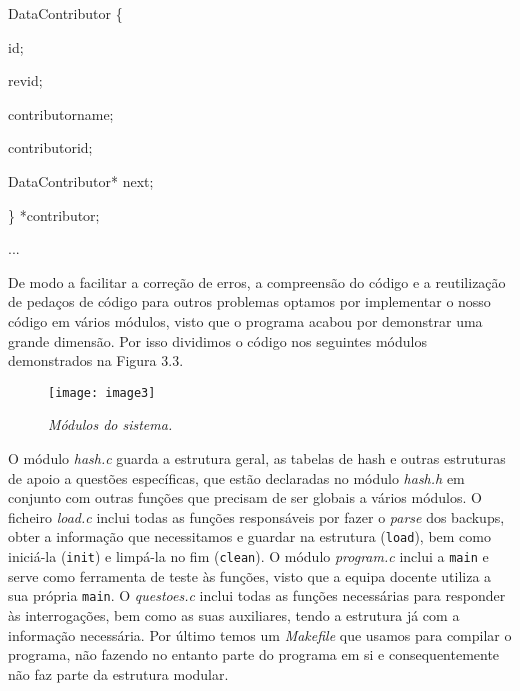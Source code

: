 \documentclass[a4paper,12pt]{report}
\newcommand\tab[1][1cm]{\hspace*{#1}}
\begin{document}
\begin{tcolorbox}[width=\textwidth,colback={darkgray},title={\sf Excerto 3.7: hash.c},outer arc=2mm,colupper=white]    
	{\footnotesize{} DataContributor \{
		
		\tab {\color{newpink}long} id;
		
		\tab {\color{newpink}int} revid;
		
		\tab {\color{newpink}char *} contributorname;
		
		\tab {\color{newpink}int} contributorid;
		
		\tab {\color{newpink}struct} DataContributor{\color{newpink}*} next;
		
		\} {\color{newpink}*}contributor;
		
		{\color{gray}...}
	
	}
\end{tcolorbox} 

De modo a facilitar a correção de erros, a compreensão do código e a reutilização de pedaços de código para outros problemas optamos por implementar o nosso código em vários módulos, visto que o programa acabou por demonstrar uma grande dimensão. Por isso dividimos o código nos seguintes módulos demonstrados na Figura 3.3.

\begin{figure}[h]
	\centering
	\texttt{[image: image3]}
	\caption{\small\sl Módulos do sistema.}
	\captionsetup[figure]{list=yes}
\end{figure}

O módulo {\sl hash.c} guarda a estrutura geral, as tabelas de hash e outras estruturas de apoio a questões específicas, que estão declaradas no módulo {\sl hash.h} em conjunto com outras funções que precisam de ser globais a vários módulos. O ficheiro {\sl load.c} inclui todas as funções responsáveis por fazer o {\sl parse} dos backups, obter a informação que necessitamos e guardar na estrutura ({\tt load}), bem como iniciá-la ({\tt init}) e limpá-la no fim ({\tt clean}). O módulo {\sl program.c} inclui a {\tt main} e serve como ferramenta de teste às funções, visto que a equipa docente utiliza a sua própria {\tt main}. O {\sl questoes.c} inclui todas as funções	necessárias para responder às interrogações, bem como as suas auxiliares, tendo a estrutura já com a informação necessária. Por último temos um {\sl Makefile} que usamos para compilar o programa, não fazendo no entanto parte do programa em si e consequentemente não faz parte da estrutura modular.
\end{document}
